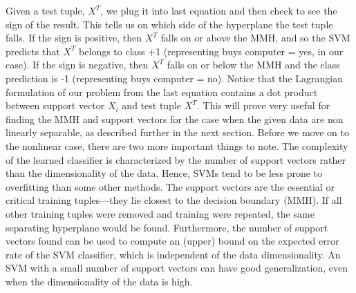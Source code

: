 \documentclass[12pt,fleqn]{book} %
\begin{document}
Given a test tuple, $X^T$, we plug it into last equation and then check to see the sign of the result. This tells us on which side of the hyperplane the test tuple falls. If the sign is positive, then $X^T$  falls on or above the MMH, and so the SVM predicts that $X^T$  belongs to class +1 (representing buys computer = yes, in our case). If the sign is negative, then $X^T$  falls on or below the MMH and the class prediction is -1 (representing buys computer = no). Notice that the Lagrangian formulation of our problem from the last equation contains a dot product between support vector $X_i$ and test tuple $X^T$. This will prove very useful for finding the MMH and support vectors for the case when the given data are non linearly separable, as described further in the next section. Before we move on to the nonlinear case, there are two more important things to note. The complexity of the learned classifier is characterized by the number of support vectors rather than the dimensionality of the data. Hence, SVMs tend to be less prone to overfitting than some other methods. The support vectors are the essential or critical training tuples—they lie closest to the decision boundary (MMH). If all other training tuples were removed and training were repeated, the same separating hyperplane would be found. Furthermore, the number of support vectors found can be used to compute an (upper) bound on the expected error rate of the SVM classifier, which is independent of the data dimensionality. An SVM with a small number of support vectors can have good generalization, even when the dimensionality of the data is high.
\end{document}
